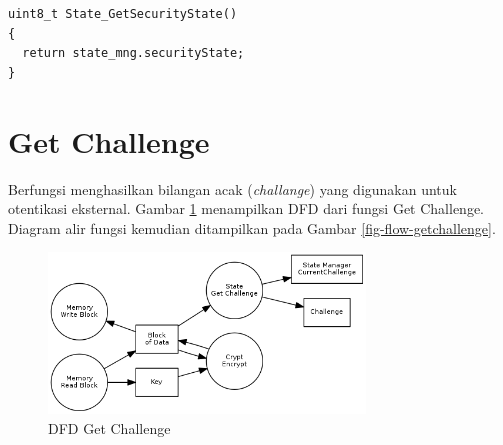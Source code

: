 \begin{lstlisting}[caption={Listing Program Fungsi Get Security State}, label={list-getsecuritystate}]
uint8_t State_GetSecurityState()
{
  return state_mng.securityState;
}
\end{lstlisting}


\section{Get Challenge}
\label{sec_getchallenge}

Berfungsi menghasilkan bilangan acak (\emph{challange}) yang digunakan untuk otentikasi eksternal. Gambar \ref{fig-dfd-getchallenge} menampilkan DFD dari fungsi Get Challenge. Diagram alir fungsi kemudian ditampilkan pada Gambar \ref{fig-flow-getchallenge}. 

\begin{figure}[h]
\centering
\includegraphics[width=0.75\textwidth]{image/state/dfd_getchallenge.png}
\caption{DFD Get Challenge}
\label{fig-dfd-getchallenge}
\end{figure}

